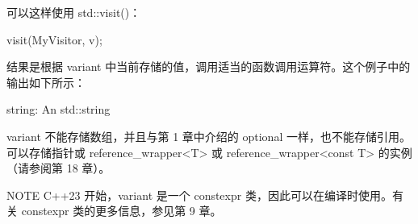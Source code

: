 可以这样使用 std::visit()：

\begin{cpp}
visit(MyVisitor{}, v);
\end{cpp}

结果是根据 variant 中当前存储的值，调用适当的函数调用运算符。这个例子中的输出如下所示：

\begin{shell}
string: An std::string
\end{shell}

variant 不能存储数组，并且与第 1 章中介绍的 optional 一样，也不能存储引用。可以存储指针或 reference\_wrapper<T> 或 reference\_wrapper<const T> 的实例（请参阅第 18 章）。

\begin{myNotic}{NOTE}
C++23 开始，variant 是一个 constexpr 类，因此可以在编译时使用。有关 constexpr 类的更多信息，参见第 9 章。
\end{myNotic}




